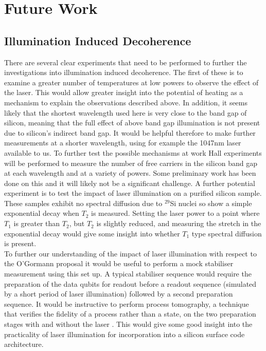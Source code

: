 \chapter{Future Work}


\section{Illumination Induced Decoherence}

There are several clear experiments that need to be performed to further the investigations into illumination induced decoherence.
The first of these is to examine a greater number of temperatures at low powers to observe the effect of the laser.
This would allow greater insight into the potential of heating as a mechanism to explain the observations described above.
In addition, it seems likely that the shortest wavelength used here is very close to the band gap of silicon, meaning that the full effect of above band gap illumination is not present due to silicon's indirect band gap.
It would be helpful therefore to make further measurements at a shorter wavelength, using for example the 1047nm laser available to us.
To further test the possible mechanisms at work Hall experiments will be performed to measure the number of free carriers in the silicon band gap at each wavelength and at a variety of powers.
Some preliminary work has been done on this and it will likely not be a significant challenge.
A further potential experiment is to test the impact of laser illumination on a purified silicon sample.
These samples exhibit no spectral diffusion due to $^{29}$Si nuclei so show a simple exponential decay when $T_2$ is measured.
Setting the laser power to a point where $T_1$ is greater than $T_2$, but $T_2$ is slightly reduced, and measuring the stretch in the exponential decay would give some insight into whether $T_1$ type spectral diffusion is present.
\\
To further our understanding of the impact of laser illumination with respect to the O'Gormann proposal it would be useful to perform a mock stabiliser measurement using this set up.
A typical stabiliser sequence would require the preparation of the data qubits for readout before a readout sequence (simulated by a short period of laser illumination) followed by a second preparation sequence.
It would be instructive to perform process tomography, a technique that verifies the fidelity of a process rather than a state, on the two preparation stages with and without the laser \cite{Nielsen:2011:QCQ:1972505}.
This would give some good insight into the practicality of laser illumination for incorporation into a silicon surface code architecture.

